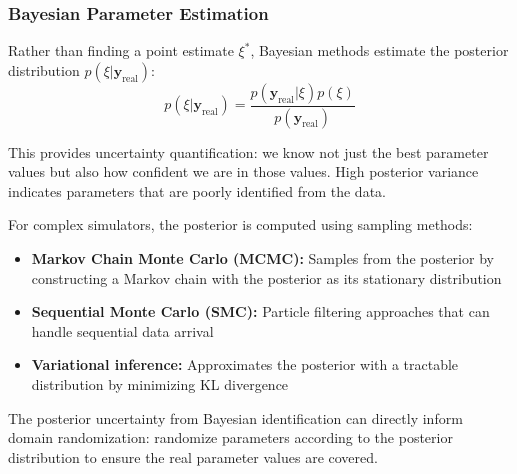 \subsubsection{Bayesian Parameter Estimation}

Rather than finding a point estimate $\xi^*$, Bayesian methods estimate the posterior distribution $p(\xi | \mathbf{y}_{\text{real}})$:
\begin{equation}
p(\xi | \mathbf{y}_{\text{real}}) = \frac{p(\mathbf{y}_{\text{real}} | \xi) p(\xi)}{p(\mathbf{y}_{\text{real}})}
\label{eq:bayesian_sysid}
\end{equation}

This provides uncertainty quantification: we know not just the best parameter values but also how confident we are in those values. High posterior variance indicates parameters that are poorly identified from the data.

For complex simulators, the posterior is computed using sampling methods:
\begin{itemize}
    \item \textbf{Markov Chain Monte Carlo (MCMC):} Samples from the posterior by constructing a Markov chain with the posterior as its stationary distribution
    \item \textbf{Sequential Monte Carlo (SMC):} Particle filtering approaches that can handle sequential data arrival
    \item \textbf{Variational inference:} Approximates the posterior with a tractable distribution by minimizing KL divergence
\end{itemize}

The posterior uncertainty from Bayesian identification can directly inform domain randomization: randomize parameters according to the posterior distribution to ensure the real parameter values are covered.

